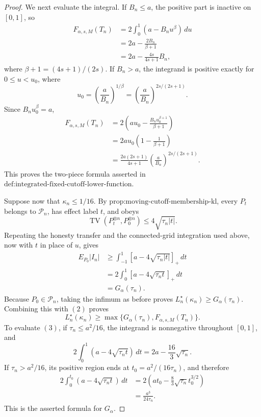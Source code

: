 \documentclass{article}
\begin{document}
\begin{proof}
We next evaluate the integral.  If \(B_n\le a\), the positive part is
inactive on \([0,1]\), so
\[
 \begin{aligned}
 F_{\alpha,s,M}(T_n)
 &=2\int_0^1(a-B_nu^\beta)\,du\\
 &=2a-\frac{2B_n}{\beta+1}\\
 &=2a-\frac{4s}{4s+1}B_n,
 \end{aligned}
\]
where \(\beta+1=(4s+1)/(2s)\).  If \(B_n>a\), the integrand is
positive exactly for \(0\le u<u_0\), where
\[
 u_0=\left(\frac a{B_n}\right)^{1/\beta}
 =\left(\frac a{B_n}\right)^{2s/(2s+1)}.
\]
Since \(B_nu_0^\beta=a\),
\[
 \begin{aligned}
 F_{\alpha,s,M}(T_n)
 &=2\left(au_0-\frac{B_nu_0^{\beta+1}}{\beta+1}\right)\\
 &=2au_0\left(1-\frac1{\beta+1}\right)\\
 &=\frac{2a(2s+1)}{4s+1}
   \left(\frac a{B_n}\right)^{2s/(2s+1)}.
 \end{aligned}
\]
This proves the two-piece formula asserted in
\(\text{def:integrated-fixed-cutoff-lower-function}\).

Suppose now that \(\kappa_n\le1/16\).  By
\(\text{prop:moving-cutoff-membership-kl}\), every \(P_t\) belongs to
\(\mathcal P_n\), has effect label \(t\), and obeys
\[
 \operatorname{TV}(P_t^{\otimes n},P_0^{\otimes n})
 \le4\sqrt{\tau_n|t|}.
\]
Repeating the honesty transfer and the connected-grid integration used
above, now with \(t\) in place of \(u\), gives
\[
 \begin{aligned}
 E_{P_0}|I_n|
 &\ge\int_{-1}^1[a-4\sqrt{\tau_n|t|}]_+\,dt\\
 &=2\int_0^1[a-4\sqrt{\tau_nt}]_+\,dt\\
 &=G_\alpha(\tau_n).
 \tag{3}
 \end{aligned}
\]
Because \(P_0\in\mathcal P_n\), taking the infimum as before proves
\(L_n^\star(\kappa_n)\ge G_\alpha(\tau_n)\).  Combining this with
\((2)\) proves
\[
 L_n^\star(\kappa_n)
 \ge\max\{G_\alpha(\tau_n),F_{\alpha,s,M}(T_n)\}.
\]
To evaluate \((3)\), if \(\tau_n\le a^2/16\), the integrand is
nonnegative throughout \([0,1]\), and
\[
 2\int_0^1(a-4\sqrt{\tau_nt})\,dt
 =2a-\frac{16}{3}\sqrt{\tau_n}.
\]
If \(\tau_n>a^2/16\), its positive region ends at
\(t_0=a^2/(16\tau_n)\), and therefore
\[
 \begin{aligned}
 2\int_0^{t_0}(a-4\sqrt{\tau_nt})\,dt
 &=2\left(at_0-\frac83\sqrt{\tau_n}t_0^{3/2}\right)\\
 &=\frac{a^3}{24\tau_n}.
 \end{aligned}
\]
This is the asserted formula for \(G_\alpha\).


\end{proof}
\end{document}

